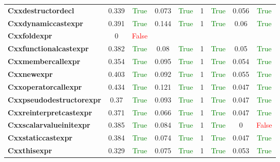 \documentclass{article}
\begin{document}
\begin{xltabular}{\textwidth}{lcccccccc}
\textbf{{\fontsize{10}{12}\selectfont Cxxdestructordecl}}& 0.339&\textcolor{green}{True}& 0.073&\textcolor{green}{True}& 1&\textcolor{green}{True}& 0.056&\textcolor{green}{True} \\[0.5ex]
\textbf{{\fontsize{10}{12}\selectfont Cxxdynamiccastexpr}}& 0.391&\textcolor{green}{True}& 0.144&\textcolor{green}{True}& 1&\textcolor{green}{True}& 0.06&\textcolor{green}{True} \\[0.5ex]
\textbf{{\fontsize{10}{12}\selectfont Cxxfoldexpr}}& 0&\textcolor{red}{False} \\[0.5ex]
\textbf{{\fontsize{10}{12}\selectfont Cxxfunctionalcastexpr}}& 0.382&\textcolor{green}{True}& 0.08&\textcolor{green}{True}& 1&\textcolor{green}{True}& 0.05&\textcolor{green}{True} \\[0.5ex]
\textbf{{\fontsize{10}{12}\selectfont Cxxmembercallexpr}}& 0.354&\textcolor{green}{True}& 0.095&\textcolor{green}{True}& 1&\textcolor{green}{True}& 0.054&\textcolor{green}{True} \\[0.5ex]
\textbf{{\fontsize{10}{12}\selectfont Cxxnewexpr}}& 0.403&\textcolor{green}{True}& 0.092&\textcolor{green}{True}& 1&\textcolor{green}{True}& 0.055&\textcolor{green}{True} \\[0.5ex]
\textbf{{\fontsize{10}{12}\selectfont Cxxoperatorcallexpr}}& 0.434&\textcolor{green}{True}& 0.121&\textcolor{green}{True}& 1&\textcolor{green}{True}& 0.047&\textcolor{green}{True} \\[0.5ex]
\textbf{{\fontsize{10}{12}\selectfont Cxxpseudodestructorexpr}}& 0.37&\textcolor{green}{True}& 0.093&\textcolor{green}{True}& 1&\textcolor{green}{True}& 0.047&\textcolor{green}{True} \\[0.5ex]
\textbf{{\fontsize{10}{12}\selectfont Cxxreinterpretcastexpr}}& 0.371&\textcolor{green}{True}& 0.066&\textcolor{green}{True}& 1&\textcolor{green}{True}& 0.047&\textcolor{green}{True} \\[0.5ex]
\textbf{{\fontsize{10}{12}\selectfont Cxxscalarvalueinitexpr}}& 0.385&\textcolor{green}{True}& 0.084&\textcolor{green}{True}& 1&\textcolor{green}{True}& 0&\textcolor{red}{False} \\[0.5ex]
\textbf{{\fontsize{10}{12}\selectfont Cxxstaticcastexpr}}& 0.384&\textcolor{green}{True}& 0.074&\textcolor{green}{True}& 1&\textcolor{green}{True}& 0.047&\textcolor{green}{True} \\[0.5ex]
\textbf{{\fontsize{10}{12}\selectfont Cxxthisexpr}}& 0.329&\textcolor{green}{True}& 0.075&\textcolor{green}{True}& 1&\textcolor{green}{True}& 0.053&\textcolor{green}{True} \\[0.5ex]

\end{xltabular}
\end{document}
